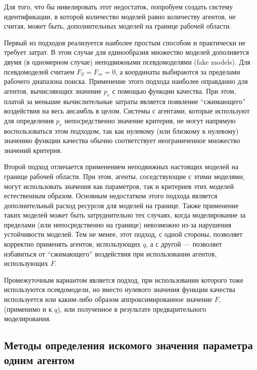 Для того, что бы нивелировать этот недостаток,
попробуем создать систему идентификации,
в которой количество моделей равно количеству агентов,
не считая, может быть, дополнительных моделей на границе рабочей области.



Первый из подходов реализуется наиболее простым способом
и практически не требует затрат.
В этом случае для единообразия множество моделей дополняется двумя
(в одномерном случае) неподвижными псевдомоделями (fake models).
Для псевдомоделей считаем $  F_{ll} = F_{rr} = 0$,
а координаты выбираются за пределами рабочего диапазона поиска.
Применение этого подхода наиболее оправданно для агентов,
вычисляющих значение $p_e$ с помощью функции качества.
При этом, платой за меньшие вычислительные затраты
является появление ``сжимающего'' воздействия на весь ансамбль в целом.
Системы с агентами, которые используют для определения $p_e$ непосредственно значение критерия,
не могут напрямую воспользоваться этом подходом,
так как нулевому (или близкому к нулевому) значению функции качества
обычно соответствует неограниченное множество значений критерия.

Второй подход отличается применением неподвижных настоящих моделей
на границе рабочей области. При этом, агенты, соседствующие с этими моделями,
могут использовать  значения как параметров, так и критериев этих
моделей естественным образом. Основным недостатком этого подхода
является дополнительный расход ресурсов для моделей на границе.
Также применение таких моделей может быть затруднительно тех случаях,
когда моделирование за пределами (или непосредственно на границе)
невозможно из-за нарушения устойчивости моделей.
Тем не менее, этот подход, с одной стороны,
позволяет корректно применять агентов, использующих $q$,
а с другой --- позволяет избавиться от ``сжимающего'' воздействия
при использовании агентов, использующих $F$.

Промежуточным вариантом является подход,
при использовании которого тоже используются
псевдомодели, но вместо нулевого значения
функции качества используется или каким-либо образом аппроксимированное
значение $F$, (применимо и к $q$), или полученное в результате
предварительного моделирования.





\subsection{ Методы определения искомого значения параметра одним агентом }  %

